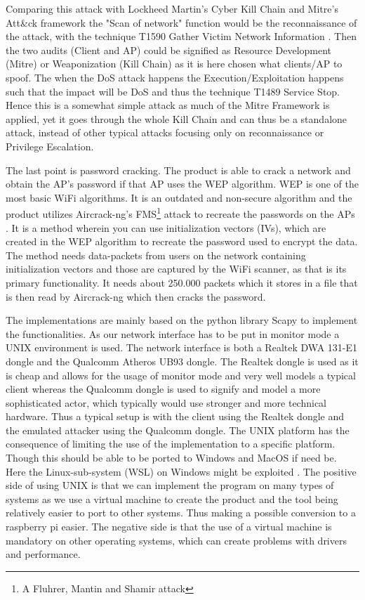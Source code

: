 Comparing this attack with Lockheed Martin's Cyber Kill Chain and Mitre's Att\&ck framework the "Scan of network" function would be the reconnaissance of the attack, with the technique T1590 Gather Victim Network Information \cite{lockheed} \cite{Mitre}. Then the two audits (Client and AP) could be signified as Resource Development (Mitre) or Weaponization (Kill Chain) as it is here chosen what clients/AP to spoof. The when the DoS attack happens the Execution/Exploitation happens such that the impact will be DoS and thus the technique T1489  Service Stop.  Hence this is a somewhat simple attack as much of the Mitre Framework is applied, yet it goes through the whole Kill Chain and can thus be a standalone attack, instead of other typical attacks focusing only on reconnaissance or Privilege Escalation.

The last point is password cracking. The product is able to crack a network and obtain the AP's password if that AP uses the WEP algorithm. WEP is one of the most basic WiFi algorithms. It is an outdated and non-secure algorithm and the product utilizes Aircrack-ng's FMS\footnote{A Fluhrer, Mantin and Shamir attack} attack to recreate the passwords on the APs \cite{aircrack-ng}. It is a method wherein you can use initialization vectors (IVs), which are created in the WEP algorithm to recreate the password used to encrypt the data. The method needs data-packets from users on the network containing initialization vectors and those are captured by the WiFi scanner, as that is its primary functionality. It needs about 250.000 packets which it stores in a file that is then read by Aircrack-ng which then cracks the password. 

The implementations are mainly based on the python library Scapy \cite{scapy} to implement the functionalities. As our network interface has to be put in monitor mode a UNIX environment is used. 
The network interface is both a Realtek DWA 131-E1 dongle and the Qualcomm Atheros UB93 dongle. The Realtek dongle is used as it is cheap and allows for the usage of monitor mode and very well models a typical client whereas the Qualcomm dongle is used to signify and model a more sophisticated actor, which typically would use stronger and more technical hardware. Thus a typical setup is with the client using the Realtek dongle and the emulated attacker using the Qualcomm dongle.
The UNIX platform has the consequence of limiting the use of the implementation to a specific platform. Though this should be able to be ported to Windows and MacOS if need be. Here the Linux-sub-system (WSL) on Windows might be exploited \cite{WSL_exploit}.
The positive side of using UNIX is that we can implement the program on many types of systems as we use a virtual machine to create the product and the tool being relatively easier to port to other systems. Thus making a possible conversion to a raspberry pi easier. The negative side is that the use of a virtual machine is mandatory on other operating systems, which can create problems with drivers and performance. 

